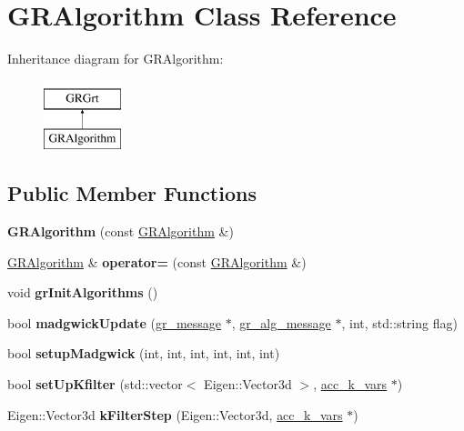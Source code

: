 \hypertarget{classGRAlgorithm}{}\section{G\+R\+Algorithm Class Reference}
\label{classGRAlgorithm}
Inheritance diagram for G\+R\+Algorithm\+:\begin{figure}[H]
\begin{center}
\leavevmode
\includegraphics[height=2.000000cm]{classGRAlgorithm}
\end{center}
\end{figure}
\subsection*{Public Member Functions}
\begin{DoxyCompactItemize}
\item 
\mbox{\label{classGRAlgorithm_ad507e4837f87aa62d71dcecdca81529e}} 
{\bfseries G\+R\+Algorithm} (const \mbox{\hyperlink{classGRAlgorithm}{G\+R\+Algorithm}} \&)
\item 
\mbox{\label{classGRAlgorithm_a4ac1b56a7745066e5b046199747ba9ce}} 
\mbox{\hyperlink{classGRAlgorithm}{G\+R\+Algorithm}} \& {\bfseries operator=} (const \mbox{\hyperlink{classGRAlgorithm}{G\+R\+Algorithm}} \&)
\item 
\mbox{\label{classGRAlgorithm_aa088e3919a405f830dce381f7b264606}} 
void {\bfseries gr\+Init\+Algorithms} ()
\item 
\mbox{\label{classGRAlgorithm_a99d42de12749f53522f0bb3b470b876c}} 
bool {\bfseries madgwick\+Update} (\mbox{\hyperlink{structgr__message}{gr\+\_\+message}} $\ast$, \mbox{\hyperlink{structgr__alg__message}{gr\+\_\+alg\+\_\+message}} $\ast$, int, std\+::string flag)
\item 
\mbox{\label{classGRAlgorithm_a4dcbcdb9e123d4b406a44cbc0f7967c1}} 
bool {\bfseries setup\+Madgwick} (int, int, int, int, int, int)
\item 
\mbox{\label{classGRAlgorithm_af66f5bd468eef3647bd8df8942df2470}} 
bool {\bfseries set\+Up\+Kfilter} (std\+::vector$<$ Eigen\+::\+Vector3d $>$, \mbox{\hyperlink{structacc__k__vars}{acc\+\_\+k\+\_\+vars}} $\ast$)
\item 
\mbox{\label{classGRAlgorithm_a23e089dbd28adfe3e36dba5ecd02dd0a}} 
Eigen\+::\+Vector3d {\bfseries k\+Filter\+Step} (Eigen\+::\+Vector3d, \mbox{\hyperlink{structacc__k__vars}{acc\+\_\+k\+\_\+vars}} $\ast$)
\end{DoxyCompactItemize}


